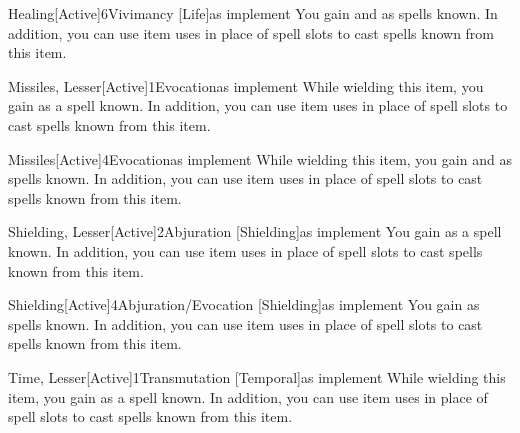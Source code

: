         \begin{magicitemdef}{Healing}[Active]{6}{Vivimancy [Life]}{as implement}
             You gain  and  as spells known.
            In addition, you can use item uses in place of spell slots to cast spells known from this item.
        \end{magicitemdef}

        \begin{magicitemdef}[Arcane]{Missiles, Lesser}[Active]{1}{Evocation}{as implement}
             While wielding this item, you gain  as a spell known.
            In addition, you can use item uses in place of spell slots to cast spells known from this item.
        \end{magicitemdef}

        \begin{magicitemdef}[Arcane]{Missiles}[Active]{4}{Evocation}{as implement}
             While wielding this item, you gain  and  as spells known.
            In addition, you can use item uses in place of spell slots to cast spells known from this item.
        \end{magicitemdef}

        \begin{magicitemdef}{Shielding, Lesser}[Active]{2}{Abjuration [Shielding]}{as implement}
             You gain  as a spell known.
            In addition, you can use item uses in place of spell slots to cast spells known from this item.
        \end{magicitemdef}

        \begin{magicitemdef}{Shielding}[Active]{4}{Abjuration/Evocation [Shielding]}{as implement}
             You gain  as spells known.
            In addition, you can use item uses in place of spell slots to cast spells known from this item.
        \end{magicitemdef}

        \begin{magicitemdef}[Arcane]{Time, Lesser}[Active]{1}{Transmutation [Temporal]}{as implement}
             While wielding this item, you gain  as a spell known.
            In addition, you can use item uses in place of spell slots to cast spells known from this item.
        \end{magicitemdef}

